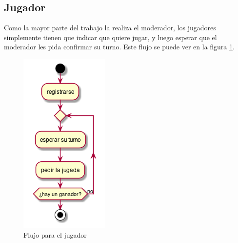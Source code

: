 \documentclass[11pt]{article}
\begin{document}
\subsection{Jugador}
\label{sec:orgd1140fc}

Como la mayor parte del trabajo la realiza el moderador, los jugadores
simplemente tienen que indicar que quiere jugar, y luego esperar que el
moderador les pida confirmar su turno. Este flujo se puede ver en la figura
\ref{fig:player-flux}.

\begin{figure}[htbp]
\centering
\includegraphics[scale=0.75]{imgs/player_flux.png}
\caption{\label{fig:player-flux}Flujo para el jugador}
\end{figure}
\end{document}
